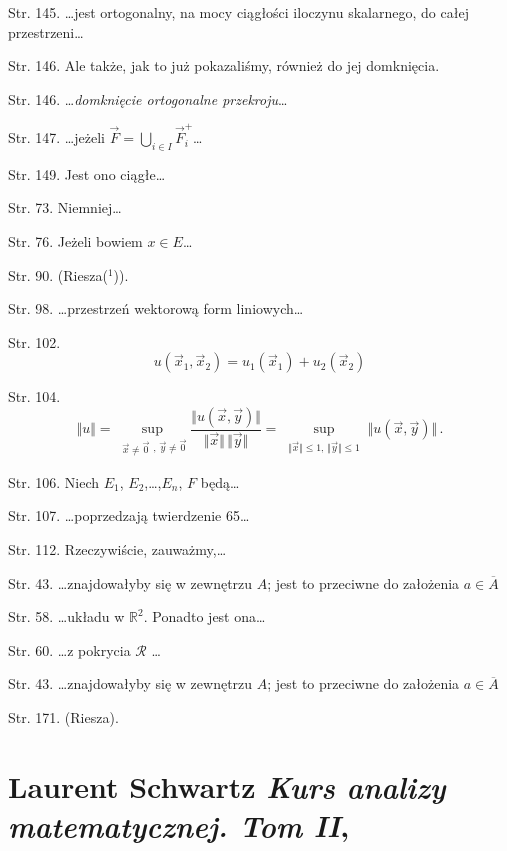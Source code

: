 \documentclass[a4paper,11pt]{article}
\numberwithin{equation}{section}
\begin{document}
Str. 145. \ldots jest ortogonalny, na mocy ciągłości iloczynu
skalarnego, do całej przestrzeni\ldots

Str. 146. Ale także, jak to już pokazaliśmy, również do jej
domknięcia.

Str. 146. \ldots\textit{domknięcie ortogonalne przekroju}\ldots

Str. 147. \ldots jeżeli
$\vec{ F } = \bigcup_{ i \in I } \vec{ F }_{ i }^{ + }$\ldots

Str. 149. Jest ono ciągłe\ldots

Str. 73. Niemniej\ldots

Str. 76. Jeżeli bowiem $x \in E$\ldots

Str. 90. \large{(Riesza($^{ 1 }$))}.

Str. 98. \ldots przestrzeń wektorową form liniowych\ldots

Str. 102.
$$u(\vec{x}_{1},\vec{x}_{2})=u_{1}(\vec{x}_{1})+u_{2}(\vec{x}_{2})$$

Str. 104.
$$\Vert u \Vert = \sup_{ \substack{ \vec{ x } \neq \vec{ 0 } },
  \,\vec{ y } \neq \vec{ 0 } } \frac{ \Vert u( \vec x, \vec y ) \Vert
}{ \Vert \vec{ x } \Vert \, \Vert \vec y \Vert } = \sup_{ \substack{
    \Vert \vec{ x } \Vert \leq 1, \, \Vert \vec{ y } \Vert \leq 1 } }
\Vert u( \vec x, \vec y ) \Vert \, .$$

Str. 106. Niech $E_{ 1 }$, $E_{ 2 }$,\ldots,$E_{ n }$, $F$
będą\ldots

Str. 107. \ldots poprzedzają twierdzenie 65\ldots

Str. 112. Rzeczywiście, zauważmy,\ldots

Str. 43. \ldots znajdowałyby się w zewnętrzu $A$; jest to
przeciwne do założenia $a \in \overline{ A }$

Str. 58. \ldots układu w $\mathbb{R}^{ 2 }$. Ponadto jest
ona\ldots

Str. 60. \ldots z pokrycia $\mathcal{R}$ \ldots

Str. 43. \ldots znajdowałyby się w zewnętrzu $A$; jest to
przeciwne do założenia $a \in \overline{ A }$

Str. 171. \large{(Riesza)}.










\newpage
\section{Laurent Schwartz \textit{Kurs analizy
    matematycznej. Tom II},
  \cite{SchwartzKursAnalizyMatematycznejVolII1980} }
\end{document}
